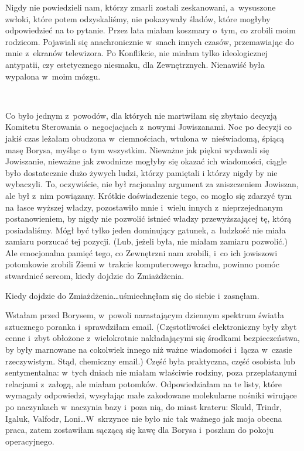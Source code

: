 \documentclass[oneside,polish,11pt,sfheadings]{mwbk}
\begin{document}
Nigdy nie powiedzieli nam, którzy zmarli zostali zeskanowani, a~wysuszone zwłoki, które potem odzyskaliśmy, nie pokazywały śladów, które
mogłyby odpowiedzieć na to pytanie. Przez lata miałam koszmary o~tym, co
zrobili moim rodzicom. Pojawiali się anachronicznie w~snach innych
czasów, przemawiając do mnie z~ekranów telewizora. Po Konflikcie, nie
miałam tylko ideologicznej antypatii, czy estetycznego niesmaku, dla
Zewnętrznych. Nienawiść była wypalona w~moim mózgu.

~

Co było jednym z~powodów, dla których nie martwiłam się zbytnio decyzją
Komitetu Sterowania o~negocjacjach z~nowymi Jowiszanami. Noc po decyzji
co jakiś czas leżałam obudzona w~ciemnościach, wtulona w~nieświadomą,
śpiącą masę Borysa, myśląc o~tym wszystkim. Nieważne jak piękni wydawali
się Jowiszanie, nieważne jak zwodnicze mogłyby się okazać ich
wiadomości, ciągle było dostatecznie dużo żywych ludzi, którzy pamiętali
i którzy nigdy by nie wybaczyli. To, oczywiście, nie był racjonalny
argument za zniszczeniem Jowiszan, ale był z~nim powiązany. Krótkie
doświadczenie tego, co mogło się zdarzyć tym na łasce wyższej władzy,
pozostawiło mnie i~wielu innych z~nieprzejednanym postanowieniem, by
nigdy nie pozwolić istnieć władzy przewyższającej tę, którą
posiadaliśmy. Mógł być tylko jeden dominujący gatunek, a~ludzkość nie
miała zamiaru porzucać tej pozycji. (Lub, jeżeli była, nie miałam
zamiaru pozwolić.) Ale emocjonalna pamięć tego, co Zewnętrzni nam
zrobili, i~co ich jowiszowi potomkowie zrobili Ziemi w~trakcie
komputerowego krachu, powinno pomóc stwardnieć sercom, kiedy dojdzie do
Zmiażdżenia.

Kiedy dojdzie do Zmiażdżenia\ldots  uśmiechnęłam się do siebie i~zasnęłam.

Wstałam przed Borysem, w~powoli narastającym dziennym spektrum światła
sztucznego poranka i~sprawdziłam email. (Częstotliwości elektroniczny
były zbyt cenne i~zbyt obłożone z~wielokrotnie nakładającymi się
środkami bezpieczeństwa, by były marnowane na cokolwiek innego niż ważne
wiadomości i~łącza w~czasie rzeczywistym. Stąd, chemiczny email.) Część
była praktyczna, część osobista lub sentymentalna: w~tych dniach nie
miałam właściwie rodziny, poza przeplatanymi relacjami z~załogą, ale
miałam potomków. Odpowiedziałam na te listy, które wymagały odpowiedzi,
wysyłając małe zakodowane molekularne nośniki wirujące po naczynkach w~naczynia bazy i~poza nią, do miast krateru: Skuld, Trindr, Igaluk,
Valfodr, Loni\ldots  W~skrzynce nie było nic tak ważnego jak moja obecna
praca, zatem zostawiłam sączącą się kawę dla Borysa i~poszłam do pokoju
operacyjnego.
\end{document}
